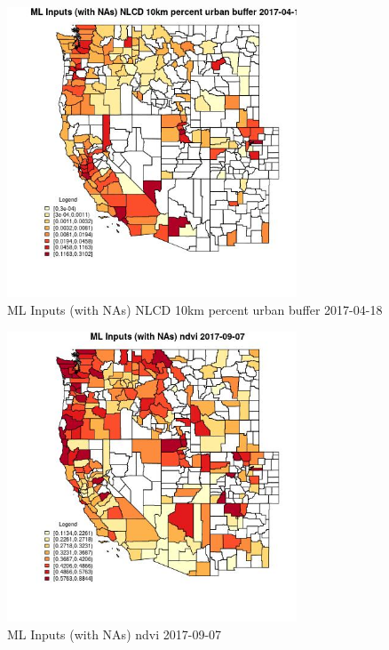 \begin{figure} 
\centering  
\includegraphics[width=0.77\textwidth]{Code_Outputs/Report_ML_input_PM25_Step4_part_e_de_duplicated_aves_compiled_2019-05-21wNAs_CountyNLCD_10km_percent_urban_bufferMean2017-04-18.jpg} 
\caption{\label{fig:Report_ML_input_PM25_Step4_part_e_de_duplicated_aves_compiled_2019-05-21wNAsCountyNLCD_10km_percent_urban_bufferMean2017-04-18}ML Inputs (with NAs) NLCD 10km percent urban buffer 2017-04-18} 
\end{figure} 
 

\begin{figure} 
\centering  
\includegraphics[width=0.77\textwidth]{Code_Outputs/Report_ML_input_PM25_Step4_part_e_de_duplicated_aves_compiled_2019-05-21wNAs_CountyndviMean2017-09-07.jpg} 
\caption{\label{fig:Report_ML_input_PM25_Step4_part_e_de_duplicated_aves_compiled_2019-05-21wNAsCountyndviMean2017-09-07}ML Inputs (with NAs) ndvi 2017-09-07} 
\end{figure} 
 

